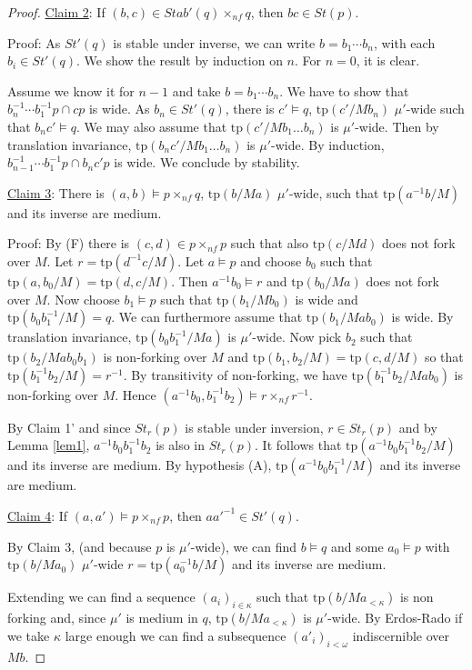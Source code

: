 \documentclass[12pt]{article}
\theoremstyle{definition}
\theoremstyle{mystyle}
\theoremstyle{remark}
\newcommand{\tp}{\mathrm{tp}}
\newcommand{\nf}{\times_{nf}}
\begin{document}
\begin{proof}
\smallskip \noindent
\underline{Claim 2}: If $(b,c)\in Stab'(q)\nf q$, then $bc\in St(p)$.

\noindent
Proof: As $St'(q)$ is stable under inverse, we can write $b=b_1\cdots b_n$, with each $b_i \in St'(q)$. We show the result by induction on $n$. For $n=0$, it is clear.

Assume we know it for $n-1$ and take $b=b_1\cdots b_n$. We have to show that $b_n^{-1}\cdots b_1^{-1} p \cap cp$ is wide. As $b_n \in St'(q)$, there is $c'\models q$, $\tp(c'/Mb_n)$ $\mu'$-wide such that $b_n c' \models q$. We may also assume that $\tp(c'/Mb_1\ldots b_n)$ is $\mu'$-wide. Then by translation invariance, $\tp(b_nc'/Mb_1\ldots b_n)$ is $\mu'$-wide. By induction, $b_{n-1}^{-1}\cdots b_1^{-1} p \cap b_nc' p$ is wide. We conclude by stability.

\medskip \noindent
\underline{Claim 3}: There is $(a,b)\models p\nf q$, $\tp(b/Ma)$ $\mu'$-wide, such that $\tp(a^{-1}b/M)$ and its inverse are medium.

\noindent
Proof: By (F) there is $(c,d)\in p\nf p$ such that also $\tp(c/Md)$ does not fork over $M$. Let $r=\tp(d^{-1}c/M)$.
Let $a\models p$ and choose $b_0$ such that $\tp(a,b_0/M)=\tp(d, c/M)$. Then $a^{-1} b_0\models r$ and $\tp(b_0/Ma)$ does not fork over $M$.
Now choose $b_1\models p$ such that  $\tp(b_1/Mb_0)$ is wide and $\tp(b_0b_1^{-1}/M)=q$. We can furthermore assume that $\tp(b_1/Mab_0)$ is wide. By translation invariance, $\tp(b_0b_1^{-1}/Ma)$ is $\mu'$-wide. Now pick $b_2$ such that $\tp(b_2/Mab_0b_1)$ is non-forking over $M$ and $\tp(b_1,b_2/M) = \tp(c,d/M)$ so that $\tp(b_1^{-1}b_2/M)= r^{-1}$. By transitivity of non-forking, we have $\tp(b_1^{-1}b_2/Mab_0)$ is non-forking over $M$. Hence $(a^{-1}b_0,b_1^{-1}b_2)\models r \nf r^{-1}$.

By Claim 1' and since $St_r(p)$ is stable under inversion, $r\in
St_r(p)$ and by Lemma \ref{lem1}, $a^{-1}b_0b_1^{-1}b_2$ is also
in $St_r(p)$. It follows that $\tp(a^{-1}b_0b_1^{-1}b_2/M)$ and
its inverse are medium. By hypothesis (A),
$\tp(a^{-1}b_0b_1^{-1}/M)$ and its inverse are medium.

\medskip \noindent
\underline{Claim 4}: If $(a,a')\models p\nf p$, then $aa'^{-1}\in
St'(q)$.

\noindent By Claim 3, (and because $p$ is $\mu'$-wide), we can
find $b\models q$ and some $a_0\models p$ with $\tp(b/Ma_0)$
$\mu'$-wide $r= \tp(a_0^{-1}b/M)$ and its inverse are medium.

Extending we can find a sequence $( a_i)_{i\in
\kappa}$ such that $\tp(b/Ma_{<\kappa})$ is non forking and, since
$\mu'$ is medium in $q$, $\tp(b/Ma_{<\kappa})$ is $\mu'$-wide. By
Erdos-Rado  if we take $\kappa$ large enough we can find a
subsequence $(a'_i)_{i<\omega}$ indiscernible over $Mb$.


\end{proof}
\end{document}
